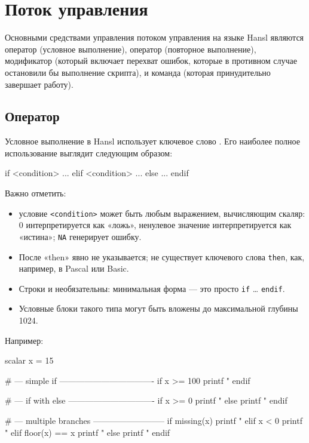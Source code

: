 \chapter{Поток управления}
\label{chap:hp-ctrlflow}

Основными средствами управления потоком управления на языке Hansl
являются оператор  (условное выполнение), оператор 
(повторное выполнение), модификатор  (который включает
перехват ошибок, которые в противном случае остановили бы выполнение
скрипта), и команда  (которая принудительно завершает
работу).

\section{Оператор }

Условное выполнение в Hansl использует ключевое слово . Его
наиболее полное использование выглядит следующим образом:
\begin{code}
if <condition>
   ...
elif <condition>
   ...
else 
   ...
endif  
\end{code}

Важно отметить:
\begin{itemize}
	
\item условие \texttt{<condition>} может быть любым выражением,
  вычисляющим скаляр: 0 интерпретируется как «ложь», ненулевое
  значение интерпретируется как «истина»; \texttt{NA} генерирует
  ошибку.
\item После  «then» явно не указывается; не существует
  ключевого слова \texttt{then}, как, например, в Pascal или Basic.
\item Строки  и  необязательны: минимальная форма
  --- это просто \texttt{if} \dots{} \texttt{endif}.
\item Условные блоки такого типа могут быть вложены до максимальной
  глубины 1024.
\end{itemize}

Например:
\begin{code}
scalar x = 15

# --- simple if ----------------------------------
if x >= 100
   printf "%
endif

# --- if with else -------------------------------
if x >= 0
   printf "%
else
   printf "%
endif

# --- multiple branches --------------------------
if missing(x)
   printf "%
elif x < 0
   printf "%
elif floor(x) == x
   printf "%
else
   printf "%
endif
\end{code}

